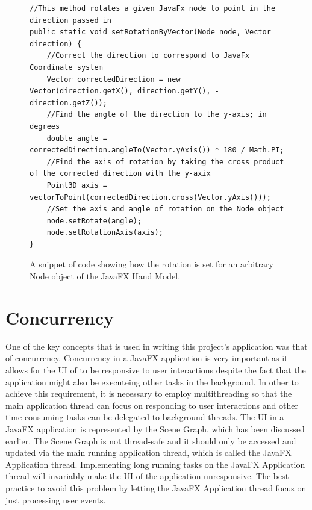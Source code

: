 \begin{figure}[th]
\centering
\begin{lstlisting}
//This method rotates a given JavaFx node to point in the direction passed in
public static void setRotationByVector(Node node, Vector direction) {
	//Correct the direction to correspond to JavaFx Coordinate system
	Vector correctedDirection = new Vector(direction.getX(), direction.getY(), -direction.getZ());
	//Find the angle of the direction to the y-axis; in degrees
	double angle = correctedDirection.angleTo(Vector.yAxis()) * 180 / Math.PI;
	//Find the axis of rotation by taking the cross product of the corrected direction with the y-axix
	Point3D axis = vectorToPoint(correctedDirection.cross(Vector.yAxis()));
	//Set the axis and angle of rotation on the Node object
	node.setRotate(angle);
	node.setRotationAxis(axis);
}
\end{lstlisting}
\caption[setRotationByVector Method]{A snippet of code showing how the rotation is set for an arbitrary Node object of the JavaFX Hand Model.}
\label{fig:setRotationByVectorCode}
\end{figure}




\section{Concurrency}
One of the key concepts that is used in writing this project's application was that of concurrency. Concurrency in a JavaFX application is very important as it allows for the UI of to be responsive to user interactions despite the fact that the application might also be executeing other tasks in the background. In other to achieve this requirement, it is necessary to employ multithreading so that the main application thread can focus on responding to user interactions and other time-consuming tasks can be delegated to background threads. The UI in a JavaFX application is represented by the Scene Graph, which has been discussed earlier. The Scene Graph is not thread-safe and it should only be accessed and updated via the main running application thread, which is called the JavaFX Application thread. Implementing long running tasks on the JavaFX Application thread will invariably make the UI of the application unresponsive. The best practice to avoid this problem by letting the JavaFX Application thread focus on just processing user events. 


